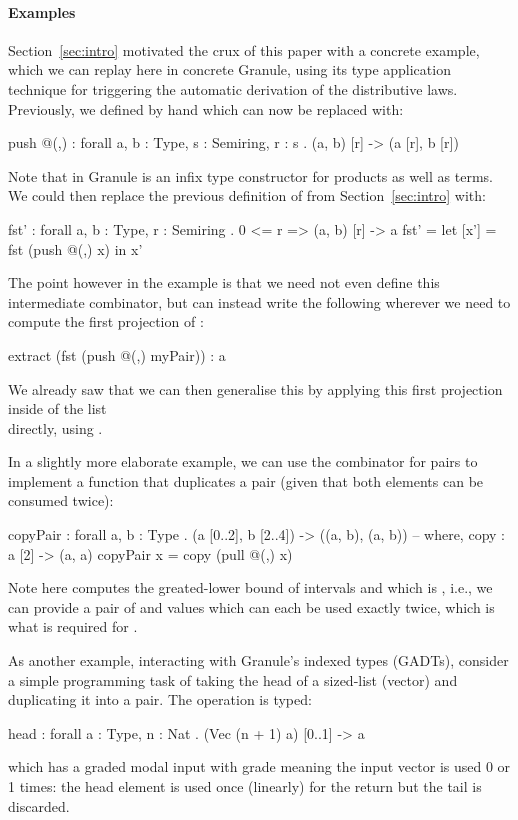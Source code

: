  \paragraph{Examples}
 Section~\ref{sec:intro} motivated the crux of this paper with a
 concrete example, which we can replay here in concrete Granule, using
 its type application technique for triggering the automatic derivation
 of the distributive laws. Previously, we defined  by
 hand which can now be replaced with:
\begin{granule}
push @(,) : forall {a, b : Type, s : Semiring, r : s} 
          . (a, b) [r] -> (a [r], b [r])
\end{granule}
 Note that in Granule \granin{(,)} is an infix type constructor for products as well as terms. We could then replace the previous definition of  from
 Section~\ref{sec:intro} with:
\begin{granule}
fst' : forall {a, b : Type, r : Semiring} 
     . {0 <= r} => (a, b) [r] -> a
fst' = let [x'] = fst (push @(,) x) in x'
\end{granule}
 The point however in the example is that we need not even define this
 intermediate combinator, but can instead write the following
 wherever we need to compute the first projection
 of :
\begin{granule}
extract (fst (push @(,) myPair)) : a
\end{granule}
 We already saw that we can then generalise this by applying
 this first projection inside of the list \\  directly, using .
 
 In a slightly more elaborate example, we can use the  combinator
 for pairs to implement a function that duplicates a pair (given that both elements
 can be consumed twice):
\begin{granule}
copyPair : forall {a, b : Type} 
         . (a [0..2], b [2..4]) -> ((a, b), (a, b))
-- where, copy : a [2] -> (a, a)
copyPair x = copy (pull @(,) x) 
\end{granule}
 Note  here computes the greated-lower
 bound of intervals  and  which is
 , i.e., we can provide a pair of  and 
 values which can each be used exactly twice, which is what is required
 for .
 
 As another example, interacting with Granule's indexed types
 (GADTs), consider a simple programming task of taking the head of a sized-list (vector)
 and duplicating it into a pair. The  operation
 is typed: 
\begin{granule}
head : forall {a : Type, n : Nat} 
     . (Vec (n + 1) a) [0..1] -> a
\end{granule}
 which has a graded modal input with grade  meaning
 the input vector is used 0 or 1 times:
 the head element is used once (linearly) for the return
 but the tail is discarded.
 
